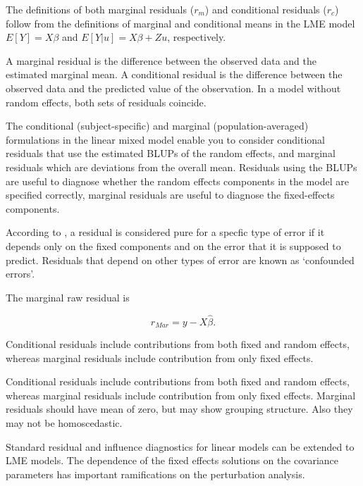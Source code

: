 \documentclass[12pt, a4paper]{report}
\theoremstyle{definition}
\theoremstyle{remark}
\begin{document}
The definitions of both marginal residuals ($r_m$) and conditional residuals ($r_c$) follow from the definitions of marginal and conditional means in the LME model 
	$E[{Y}] = {X}{\beta}$ and $E[{Y|{u}}] = {X}{\beta} + {Z}{u}$, respectively.
	
A marginal residual is the difference between the observed data and the estimated marginal mean. A conditional residual is the difference between the observed data and the predicted value of the observation. In a model without random effects, both sets of residuals coincide.
	

The conditional (subject-specific) and marginal (population-averaged) formulations in the linear mixed model enable you to consider conditional residuals that use the estimated BLUPs of the random effects, and marginal residuals which are deviations from the overall mean. Residuals using the BLUPs are useful to diagnose whether the random effects components in the model are specified correctly, marginal residuals are useful to diagnose the fixed-effects components.	
	
	
According to \citet{hilden1995}, a residual is considered pure for a specfic type of error if it depends only on the fixed components and on the error that it is supposed to predict. Residuals that depend on other types of error are known as `confounded errors'.
	
	
The marginal raw residual is

\[ r_{Mar} = y - X \hat{\beta}. \]

Conditional residuals include contributions from both fixed and random effects, whereas marginal residuals include contribution from only fixed effects.
	



Conditional residuals include contributions from both fixed and random effects, whereas marginal residuals include contribution from only fixed effects. Marginal residuals should have mean of zero, but may show grouping structure. Also they may not be homoscedastic.


Standard residual and influence diagnostics for linear models can be extended to LME models. The dependence of the fixed effects solutions on the covariance parameters has important ramifications on the perturbation analysis. 
\end{document}
